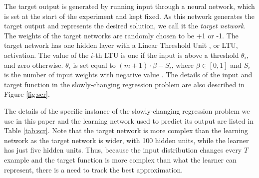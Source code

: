 \documentclass[review, number,3p]{elsarticle}
\begin{document}
The target output is generated by running input through a neural network, which is set at the start of the experiment and kept fixed.
As this network generates the target output and represents the desired solution, we call it the \emph{target network}.
The weights of the target networks are randomly chosen to be +1 or -1.
The target network has one hidden layer with a Linear Threshold Unit \cite{mcculloch1943}, or LTU, activation. 
The value of the $i$-th LTU is one if the input is above a threshold $\theta_i$, and zero otherwise. 
$\theta_i$ is set equal to $(m+1) \cdot \beta - S_i$, where $\beta \in [0,1]$ and $S_i$ is the number of input weights with negative value \cite{sutton1993}. 
The details of the input and target function in the slowly-changing regression problem are also described in Figure \ref{fig:scr}.

The details of the specific instance of the slowly-changing regression problem we use in this paper and the learning network used to predict its output are listed in Table \ref{tab:scr}. 
Note that the target network is more complex than the learning network as the target network is wider, with 100 hidden units, while the learner has just five hidden units. 
Thus, because the input distribution changes every $T$ example and the target function is more complex than what the learner can represent, there is a need to track the best approximation.
 
\end{document}
